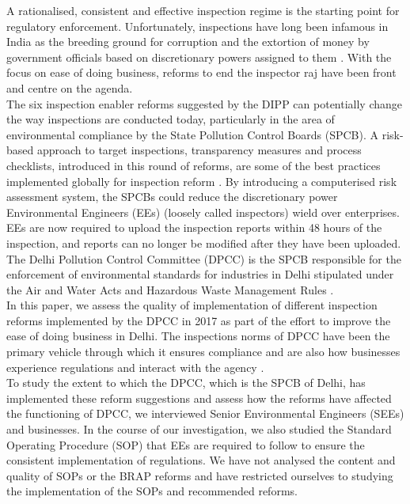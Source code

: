 \documentclass[a4paper, 12pt]{article}
\begin{document}
                  A rationalised, consistent and effective inspection regime is the starting point for regulatory enforcement. Unfortunately, inspections have long been infamous in India as the breeding ground for corruption and the extortion of money by government officials based on discretionary powers assigned to them \parencite{PHD}. With the focus on ease of doing business, reforms to end the inspector raj \parencite{livemintnews} have been front and centre on the agenda. \\
                  
                  The six inspection enabler reforms suggested by the DIPP can potentially change the way inspections are conducted today, particularly in the area of environmental compliance by the State Pollution Control Boards (SPCB). A risk-based approach to target inspections, transparency measures and process checklists, introduced in this round of reforms, are some of the best practices implemented globally for inspection reform \parencite{blancflorentin}. By introducing a computerised risk assessment system, the SPCBs could reduce the discretionary power Environmental Engineers (EEs) (loosely called inspectors) wield over enterprises. EEs are now required to upload the inspection reports within 48 hours of the inspection, and reports can no longer be modified after they have been uploaded. \\
                  
                 The Delhi Pollution Control Committee (DPCC) is the SPCB responsible for the enforcement of environmental standards for industries in Delhi stipulated under the Air and Water Acts and Hazardous Waste Management Rules \parencite{DPCCb}. \\
                 
                 In this paper, we assess the quality of implementation of different inspection reforms implemented by the DPCC in 2017 as part of the effort to improve the ease of doing business in Delhi. The inspections norms of DPCC have been the primary vehicle through which it ensures compliance and are also how businesses experience regulations and interact with the agency \parencite{DPCCb}. \\
                 
                 To study the extent to which the DPCC, which is the SPCB of Delhi, has implemented these reform suggestions and assess how the reforms have affected the functioning of DPCC, we interviewed Senior Environmental Engineers (SEEs) and businesses. In the course of our investigation, we also studied the Standard Operating Procedure (SOP) that EEs are required to follow to ensure the consistent implementation of regulations. We have not analysed the content and quality of SOPs or the BRAP reforms and have restricted ourselves to studying the implementation of the SOPs and recommended reforms. \\
                 
\end{document}
